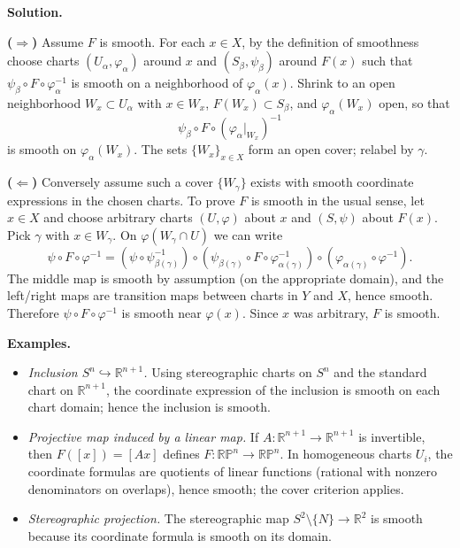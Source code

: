 \documentclass[12pt,a4paper]{article}
\theoremstyle{plain}
\theoremstyle{definition}      %
\begin{document}
\medskip
\noindent\textbf{Solution.}

\smallskip
\noindent\textbf{($\Rightarrow$)}
Assume $F$ is smooth. For each $x\in X$, by the definition of smoothness choose charts
$(U_\alpha,\varphi_\alpha)$ around $x$ and $(S_\beta,\psi_\beta)$ around $F(x)$ such that
$\psi_\beta\circ F\circ\varphi_\alpha^{-1}$ is smooth on a neighborhood of $\varphi_\alpha(x)$.
Shrink to an open neighborhood $W_x\subset U_\alpha$ with $x\in W_x$, $F(W_x)\subset S_\beta$,
and $\varphi_\alpha(W_x)$ open, so that
\[
\psi_\beta\circ F\circ(\varphi_\alpha\vert_{W_x})^{-1}
\]
is smooth on $\varphi_\alpha(W_x)$. The sets $\{W_x\}_{x\in X}$ form an open cover; relabel by $\gamma$.

\smallskip
\noindent\textbf{($\Leftarrow$)}
Conversely assume such a cover $\{W_\gamma\}$ exists with smooth coordinate expressions in the chosen charts.
To prove $F$ is smooth in the usual sense, let $x\in X$ and choose arbitrary charts $(U,\varphi)$ about $x$
and $(S,\psi)$ about $F(x)$. Pick $\gamma$ with $x\in W_\gamma$.
On $\varphi(W_\gamma\cap U)$ we can write
\[
\psi\circ F\circ\varphi^{-1}
=
(\psi\circ\psi_{\beta(\gamma)}^{-1})
\circ
(\psi_{\beta(\gamma)}\circ F\circ\varphi_{\alpha(\gamma)}^{-1})
\circ
(\varphi_{\alpha(\gamma)}\circ\varphi^{-1}).
\]
The middle map is smooth by assumption (on the appropriate domain),
and the left/right maps are transition maps between charts in $Y$ and $X$, hence smooth.
Therefore $\psi\circ F\circ\varphi^{-1}$ is smooth near $\varphi(x)$.
Since $x$ was arbitrary, $F$ is smooth.

\medskip
\noindent\textbf{Examples.}
\begin{itemize}
	\item \emph{Inclusion $S^n\hookrightarrow\mathbb R^{n+1}$.}
	Using stereographic charts on $S^n$ and the standard chart on $\mathbb R^{n+1}$,
	the coordinate expression of the inclusion is smooth on each chart domain; hence the inclusion is smooth.
	\item \emph{Projective map induced by a linear map.}
	If $A:\mathbb R^{n+1}\to\mathbb R^{n+1}$ is invertible, then $F([x])=[Ax]$ defines $F:\mathbb{RP}^n\to\mathbb{RP}^n$.
	In homogeneous charts $U_i$, the coordinate formulas are quotients of linear functions (rational with nonzero denominators on overlaps),
	hence smooth; the cover criterion applies.
	\item \emph{Stereographic projection.}
	The stereographic map $S^2\setminus\{N\}\to\mathbb R^2$ is smooth because its coordinate formula is smooth on its domain.
\end{itemize}
\end{document}
